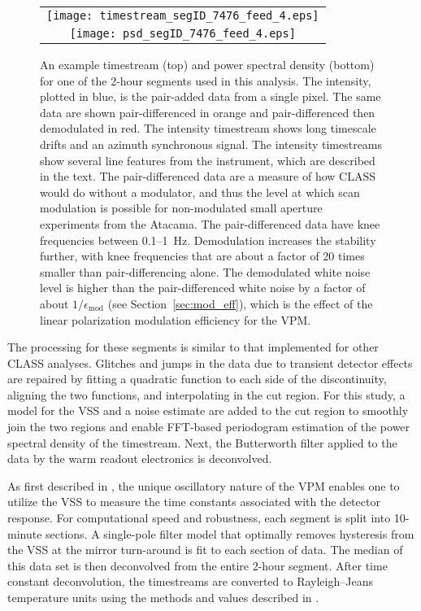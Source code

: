 \documentclass[twocolumn, tighten, numberedappendix, twocolappendix]{aastex63}
\begin{document}
\begin{figure*}
    \centering
    \begin{tabular}{c}
         \texttt{[image: timestream\_segID\_7476\_feed\_4.eps]}\\
         \texttt{[image: psd\_segID\_7476\_feed\_4.eps]}
    \end{tabular}
    \caption{\label{fig:ex_tod_psd} An example timestream (top) and power spectral density (bottom) for one of the 2-hour segments used in this analysis. The intensity, plotted in blue, is the pair-added data from a single pixel. The same data are shown pair-differenced in orange and pair-differenced then demodulated in red. The intensity timestream shows long timescale drifts and an azimuth synchronous signal. The intensity timestreams show several line features from the instrument, which are described in the text. The pair-differenced data are a measure of how CLASS would do without a modulator, and thus the level at which scan modulation is possible for non-modulated small aperture experiments from the Atacama. The pair-differenced data have knee frequencies between 0.1--1~Hz. Demodulation increases the stability further, with knee frequencies that are about a factor of 20 times smaller than pair-differencing alone. The demodulated white noise level is higher than the pair-differenced white noise by a factor of about $1/\epsilon_\mathrm{mod}$ (see Section~\ref{sec:mod_eff}), which is the effect of the linear polarization modulation efficiency for the VPM.}
\end{figure*}

The processing for these segments is similar to that implemented for other CLASS analyses. Glitches and jumps in the data due to transient detector effects are repaired by fitting a quadratic function to each side of the discontinuity, aligning the two functions, and interpolating in the cut region. For this study, a model for the VSS and a noise estimate are added to the cut region to smoothly join the two regions and enable FFT-based periodogram estimation of the power spectral density of the timestream. Next, the Butterworth filter applied to the data by the warm readout electronics is deconvolved.


As first described in \cite{appe19}, the unique oscillatory nature of the VPM enables one to utilize the VSS to measure the time constants associated with the detector response. For computational speed and robustness, each segment is split into 10-minute sections. A single-pole filter model that optimally removes hysteresis from the VSS at the mirror turn-around is fit to each section of data. The median of this data set is then deconvolved from the entire 2-hour segment. After time constant deconvolution, the timestreams are converted to Rayleigh–Jeans temperature units using the methods and values described in \cite{appe19}. 
\end{document}
